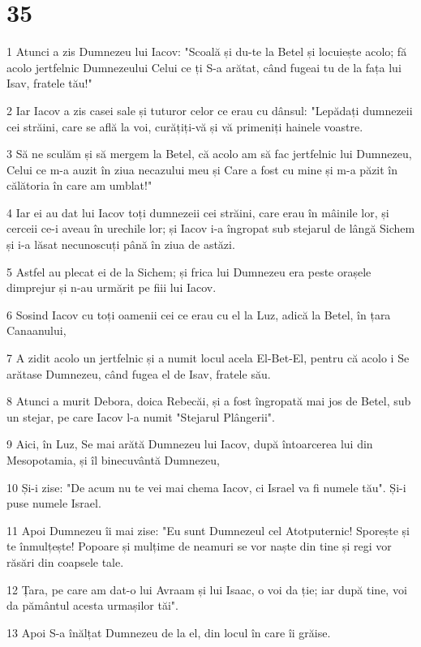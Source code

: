 \chapter{35}

\par 1 Atunci a zis Dumnezeu lui Iacov: "Scoală și du-te la Betel și locuiește acolo; fă acolo jertfelnic Dumnezeului Celui ce ți S-a arătat, când fugeai tu de la fața lui Isav, fratele tău!"
\par 2 Iar Iacov a zis casei sale și tuturor celor ce erau cu dânsul: "Lepădați dumnezeii cei străini, care se află la voi, curățiți-vă și vă primeniți hainele voastre.
\par 3 Să ne sculăm și să mergem la Betel, că acolo am să fac jertfelnic lui Dumnezeu, Celui ce m-a auzit în ziua necazului meu și Care a fost cu mine și m-a păzit în călătoria în care am umblat!"
\par 4 Iar ei au dat lui Iacov toți dumnezeii cei străini, care erau în mâinile lor, și cerceii ce-i aveau în urechile lor; și Iacov i-a îngropat sub stejarul de lângă Sichem și i-a lăsat necunoscuți până în ziua de astăzi.
\par 5 Astfel au plecat ei de la Sichem; și frica lui Dumnezeu era peste orașele dimprejur și n-au urmărit pe fiii lui Iacov.
\par 6 Sosind Iacov cu toți oamenii cei ce erau cu el la Luz, adică la Betel, în țara Canaanului,
\par 7 A zidit acolo un jertfelnic și a numit locul acela El-Bet-El, pentru că acolo i Se arătase Dumnezeu, când fugea el de Isav, fratele său.
\par 8 Atunci a murit Debora, doica Rebecăi, și a fost îngropată mai jos de Betel, sub un stejar, pe care Iacov l-a numit "Stejarul Plângerii".
\par 9 Aici, în Luz, Se mai arătă Dumnezeu lui Iacov, după întoarcerea lui din Mesopotamia, și îl binecuvântă Dumnezeu,
\par 10 Și-i zise: "De acum nu te vei mai chema Iacov, ci Israel va fi numele tău". Și-i puse numele Israel.
\par 11 Apoi Dumnezeu îi mai zise: "Eu sunt Dumnezeul cel Atotputernic! Sporește și te înmulțește! Popoare și mulțime de neamuri se vor naște din tine și regi vor răsări din coapsele tale.
\par 12 Țara, pe care am dat-o lui Avraam și lui Isaac, o voi da ție; iar după tine, voi da pământul acesta urmașilor tăi".
\par 13 Apoi S-a înălțat Dumnezeu de la el, din locul în care îi grăise.
